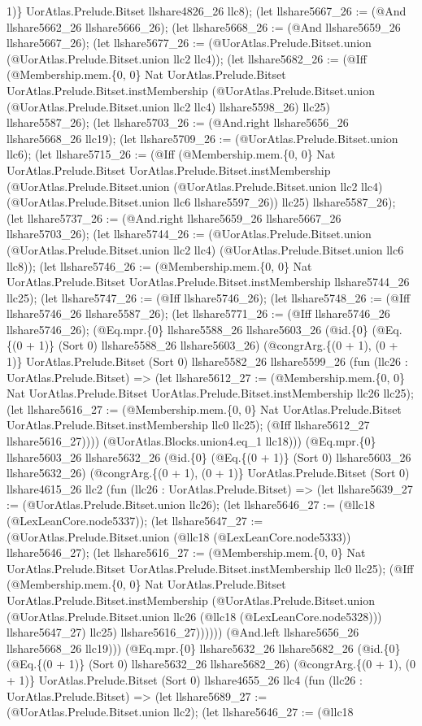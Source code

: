 \documentclass[11pt]{article}
\begin{document}
1)\} UorAtlas.Prelude.Bitset llshare4826\_26 llc8); (let llshare5667\_26 := (@And llshare5662\_26 llshare5666\_26); (let llshare5668\_26 := (@And llshare5659\_26 llshare5667\_26); (let llshare5677\_26 := (@UorAtlas.Prelude.Bitset.union (@UorAtlas.Prelude.Bitset.union llc2 llc4)); (let llshare5682\_26 := (@Iff (@Membership.mem.\{0, 0\} Nat UorAtlas.Prelude.Bitset UorAtlas.Prelude.Bitset.instMembership (@UorAtlas.Prelude.Bitset.union (@UorAtlas.Prelude.Bitset.union llc2 llc4) llshare5598\_26) llc25) llshare5587\_26); (let llshare5703\_26 := (@And.right llshare5656\_26 llshare5668\_26 llc19); (let llshare5709\_26 := (@UorAtlas.Prelude.Bitset.union llc6); (let llshare5715\_26 := (@Iff (@Membership.mem.\{0, 0\} Nat UorAtlas.Prelude.Bitset UorAtlas.Prelude.Bitset.instMembership (@UorAtlas.Prelude.Bitset.union (@UorAtlas.Prelude.Bitset.union llc2 llc4) (@UorAtlas.Prelude.Bitset.union llc6 llshare5597\_26)) llc25) llshare5587\_26); (let llshare5737\_26 := (@And.right llshare5659\_26 llshare5667\_26 llshare5703\_26); (let llshare5744\_26 := (@UorAtlas.Prelude.Bitset.union (@UorAtlas.Prelude.Bitset.union llc2 llc4) (@UorAtlas.Prelude.Bitset.union llc6 llc8)); (let llshare5746\_26 := (@Membership.mem.\{0, 0\} Nat UorAtlas.Prelude.Bitset UorAtlas.Prelude.Bitset.instMembership llshare5744\_26 llc25); (let llshare5747\_26 := (@Iff llshare5746\_26); (let llshare5748\_26 := (@Iff llshare5746\_26 llshare5587\_26); (let llshare5771\_26 := (@Iff llshare5746\_26 llshare5746\_26); (@Eq.mpr.\{0\} llshare5588\_26 llshare5603\_26 (@id.\{0\} (@Eq.\{(0 + 1)\} (Sort 0) llshare5588\_26 llshare5603\_26) (@congrArg.\{(0 + 1), (0 + 1)\} UorAtlas.Prelude.Bitset (Sort 0) llshare5582\_26 llshare5599\_26 (fun (llc26 : UorAtlas.Prelude.Bitset) => (let llshare5612\_27 := (@Membership.mem.\{0, 0\} Nat UorAtlas.Prelude.Bitset UorAtlas.Prelude.Bitset.instMembership llc26 llc25); (let llshare5616\_27 := (@Membership.mem.\{0, 0\} Nat UorAtlas.Prelude.Bitset UorAtlas.Prelude.Bitset.instMembership llc0 llc25); (@Iff llshare5612\_27 llshare5616\_27)))) (@UorAtlas.Blocks.union4.eq\_1 llc18))) (@Eq.mpr.\{0\} llshare5603\_26 llshare5632\_26 (@id.\{0\} (@Eq.\{(0 + 1)\} (Sort 0) llshare5603\_26 llshare5632\_26) (@congrArg.\{(0 + 1), (0 + 1)\} UorAtlas.Prelude.Bitset (Sort 0) llshare4615\_26 llc2 (fun (llc26 : UorAtlas.Prelude.Bitset) => (let llshare5639\_27 := (@UorAtlas.Prelude.Bitset.union llc26); (let llshare5646\_27 := (@llc18 (@LexLeanCore.node5337)); (let llshare5647\_27 := (@UorAtlas.Prelude.Bitset.union (@llc18 (@LexLeanCore.node5333)) llshare5646\_27); (let llshare5616\_27 := (@Membership.mem.\{0, 0\} Nat UorAtlas.Prelude.Bitset UorAtlas.Prelude.Bitset.instMembership llc0 llc25); (@Iff (@Membership.mem.\{0, 0\} Nat UorAtlas.Prelude.Bitset UorAtlas.Prelude.Bitset.instMembership (@UorAtlas.Prelude.Bitset.union (@UorAtlas.Prelude.Bitset.union llc26 (@llc18 (@LexLeanCore.node5328))) llshare5647\_27) llc25) llshare5616\_27)))))) (@And.left llshare5656\_26 llshare5668\_26 llc19))) (@Eq.mpr.\{0\} llshare5632\_26 llshare5682\_26 (@id.\{0\} (@Eq.\{(0 + 1)\} (Sort 0) llshare5632\_26 llshare5682\_26) (@congrArg.\{(0 + 1), (0 + 1)\} UorAtlas.Prelude.Bitset (Sort 0) llshare4655\_26 llc4 (fun (llc26 : UorAtlas.Prelude.Bitset) => (let llshare5689\_27 := (@UorAtlas.Prelude.Bitset.union llc2); (let llshare5646\_27 := (@llc18 
\end{document}
